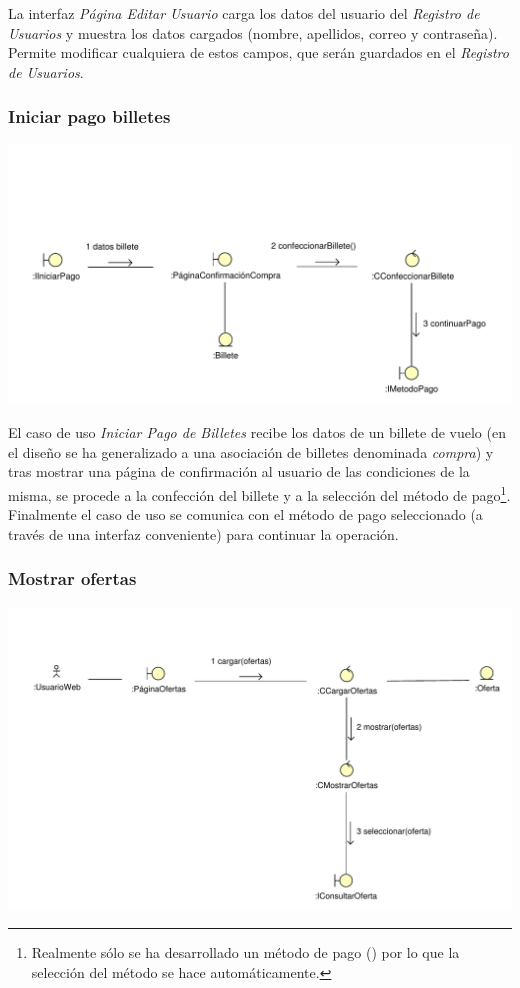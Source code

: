 \documentclass[11pt, a4paper, twoside, titlepage]{article}
\begin{document}
					La interfaz {\itshape Página Editar Usuario} carga los datos del usuario del {\itshape Registro de Usuarios} y  muestra los datos cargados (nombre, apellidos, correo y contraseña). Permite modificar cualquiera de estos campos, que serán guardados en el {\itshape Registro de Usuarios}.

			\subsubsection{Iniciar pago billetes}
				\begin{center}
					\includegraphics[scale=.76]{analisis/diagramas/iniciarpagobilletes.pdf}
				\end{center}
				
					El caso de uso {\itshape Iniciar Pago de Billetes} recibe los datos de un billete de vuelo (en el diseño se ha generalizado a una asociación de billetes denominada {\itshape compra}) y tras mostrar una página de confirmación al usuario de las condiciones de la misma, se procede a la confección del billete y a la selección del método de pago\footnote{Realmente sólo se ha desarrollado un método de pago () por lo que la selección del método se hace automáticamente.}. Finalmente el caso de uso se comunica con el método de pago seleccionado (a través de una interfaz conveniente) para continuar la operación.

			\subsubsection{Mostrar ofertas}
				\begin{center}
					\includegraphics[scale=.72]{analisis/diagramas/mostrarofertas.pdf}
				\end{center}
				
\end{document}
